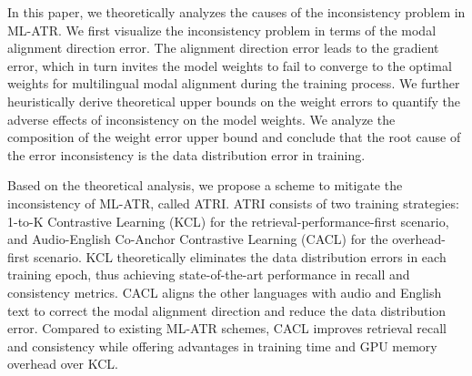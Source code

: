 In this paper, we theoretically analyzes the causes of the inconsistency problem in ML-ATR. We first visualize the inconsistency problem in terms of the modal alignment direction error. The alignment direction error leads to the gradient error, which in turn invites the model weights to fail to converge to the optimal weights for multilingual modal alignment during the training process. We further heuristically derive theoretical upper bounds on the weight errors to quantify the adverse effects of inconsistency on the model weights. We analyze the composition of the weight error upper bound and conclude that the root cause of the error inconsistency is the data distribution error in training.


Based on the theoretical analysis, we propose a scheme to mitigate the inconsistency of ML-ATR, called ATRI. ATRI consists of two training strategies: 1-to-K Contrastive Learning (KCL) for the retrieval-performance-first scenario, and Audio-English Co-Anchor Contrastive Learning (CACL) for the overhead-first scenario. KCL theoretically eliminates the data distribution errors in each training epoch, thus achieving state-of-the-art performance in recall and consistency metrics. CACL aligns the other languages with audio and English text to correct the modal alignment direction and reduce the data distribution error. Compared to existing ML-ATR schemes, CACL improves retrieval recall and consistency while offering advantages in training time and GPU memory overhead over KCL.


